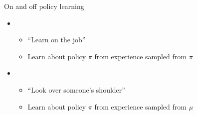 \bgroup
\begin{frame}{On and off policy learning}
\begin{itemize}
\item {} 
\begin{itemize}
\item ``Learn on the job''
\item Learn about policy $\pi$ from experience sampled from $\pi$
\end{itemize}
\item {}
\begin{itemize}
\item ``Look over someone’s shoulder''
\item Learn about policy $\pi$ from experience sampled from $\mu$
\end{itemize}
\end{itemize}
\end{frame}
\egroup